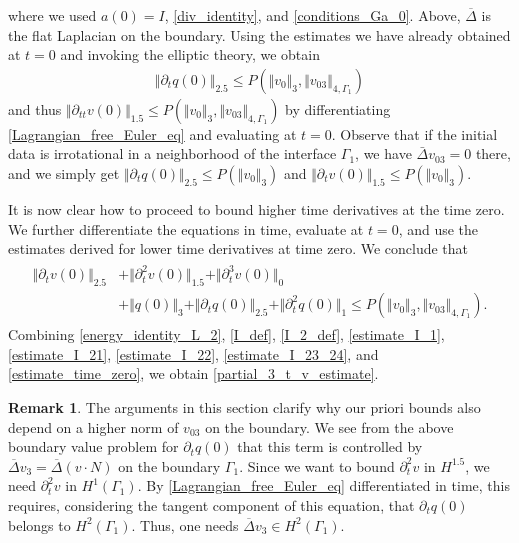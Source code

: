 \documentclass[10pt,reqno]{amsart}
\theoremstyle{plain}
\theoremstyle{definition}
\newtheorem{remark}[theorem]{Remark}
\numberwithin{equation}{section}
\newcommand{\Ga}{\Gamma}
\newcommand{\norm}[1]{\Vert#1\Vert}
\begin{document}
where we used $a(0) = I$, \eqref{div_identity}, and \eqref{conditions_Ga_0}.
Above, $\overline{\Delta}$ is the flat Laplacian on the boundary.
Using the estimates we have already obtained at $t=0$ and invoking the
elliptic
theory, we obtain
\begin{gather}
\norm{ \partial_t q(0) }_{2.5} \leq  P( \norm{ v_0}_3, \norm{ v_{03} }_{4,\Ga_1} )
\nonumber
\end{gather}
and thus
$\norm{ \partial_{tt} v(0) }_{1.5} \leq  P( \norm{ v_0}_3, \norm{
v_{03} }_{4,\Ga_1} )$
by differentiating
\eqref{Lagrangian_free_Euler_eq}
and evaluating at $t=0$.
Observe that if the initial data is irrotational
in a neighborhood of the 
interface $\Gamma_1$, 
we have $\bar\Delta v_{03}=0$ there, and
we simply get
$\norm{ \partial_t q(0) }_{2.5} \leq  P( \norm{ v_0}_3)$
and
$\norm{ \partial_t v(0) }_{1.5} \leq  P( \norm{ v_0}_3)$.


It is now clear how to proceed to bound higher time derivatives at the time zero.
We further differentiate the equations in time, evaluate at $t=0$, and use the 
estimates derived for lower time derivatives at time zero. We conclude that
\begin{align}
\begin{split}
 \norm{\partial_t v(0)}_{2.5} & + \norm{\partial^2_t v(0)}_{1.5}
+ \norm{\partial^3_t v(0)}_0
\\
&
+ \norm{q(0)}_3 + \norm{\partial_t q(0)}_{2.5} + \norm{\partial^2_t q(0)}_1 \leq 
 P( \norm{ v_0}_3, \norm{ v_{03}}_{4,\Ga_1} ).
\end{split}
\label{estimate_time_zero}
\end{align}
Combining 
\eqref{energy_identity_L_2}, \eqref{I_def},
 \eqref{I_2_def},
\eqref{estimate_I_1}, \eqref{estimate_I_21},
\eqref{estimate_I_22}, \eqref{estimate_I_23_24}, and
\eqref{estimate_time_zero}, we obtain
\eqref{partial_3_t_v_estimate}.


\begin{remark}
The arguments in this section clarify why 
our priori bounds also depend on a higher norm of 
$v_{03}$ 
on the boundary.
We see from the above boundary value problem for $\partial_t q(0)$ that this term is 
controlled by  $\overline{\Delta} v_3 = \overline{\Delta} (v \cdot N)$ on the boundary
$\Ga_1$. Since we want to bound $\partial^2_t v$ in $H^{1.5}$, we need $\partial^2_t v$
in $H^1(\Ga_1)$. By \eqref{Lagrangian_free_Euler_eq} differentiated in time, this requires,
considering the tangent component of this equation, that $\partial_t q(0)$ 
belongs to $H^2(\Ga_1)$.
Thus, one needs $\overline{\Delta} 
v_{3}
\in H^2(\Ga_1)$.
\label{remark_extra_regularity}
\end{remark}
\end{document}
